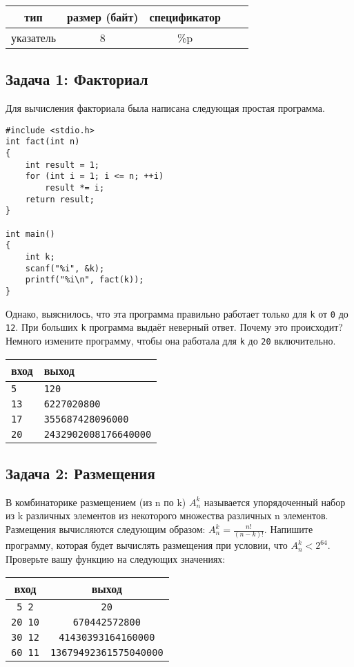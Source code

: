 \documentclass{article}
\begin{document}
\begin{center}
\begin{tabular}{ c c c c c }
 тип & размер (байт)  & спецификатор \\ \hline
 указатель             & 8           & \%p \\ 
\end{tabular}
\end{center}


\subsection*{Задача 1: Факториал}
Для вычисления факториала была написана следующая простая программа. 
\begin{lstlisting}
#include <stdio.h>
int fact(int n) 
{
    int result = 1;
    for (int i = 1; i <= n; ++i)
        result *= i;
    return result;
}

int main() 
{
    int k;
    scanf("%i", &k);
    printf("%i\n", fact(k));
}
\end{lstlisting}
Однако, выяснилось, что эта программа правильно работает только для \texttt{k} от \texttt{0} до \texttt{12}. При больших \texttt{k} программа выдаёт неверный ответ. Почему это происходит?
Немного измените программу, чтобы она работала для \texttt{k} до \texttt{20} включительно.

\begin{center}
\begin{tabular}{ l l }
 вход & выход \\ \hline
 \texttt{5} & \texttt{120}  \\ 
 \texttt{13} & \texttt{6227020800} \\
 \texttt{17} & \texttt{355687428096000} \\
 \texttt{20} & \texttt{2432902008176640000} \\
\end{tabular}
\end{center}


\subsection*{Задача 2: Размещения}
В комбинаторике размещением (из n по k) $A_n^k$ называется упорядоченный набор из k различных элементов из некоторого множества различных n элементов. Размещения вычисляются следующим образом: $A_n^k = \frac{n!}{(n-k)!}$. Напишите программу, которая будет вычислять размещения при условии, что  $A_n^k < 2^{64}$. Проверьте вашу функцию на следующих значениях:
\begin{center}
\begin{tabular}{ c c }
 вход & выход \\ \hline
 \texttt{5 2} & \texttt{20}  \\ 
 \texttt{20 10} & \texttt{670442572800}  \\ 
 \texttt{30 12} & \texttt{41430393164160000} \\ 
 \texttt{60 11} & \texttt{13679492361575040000} \\   
\end{tabular}
\end{center}
\end{document}
